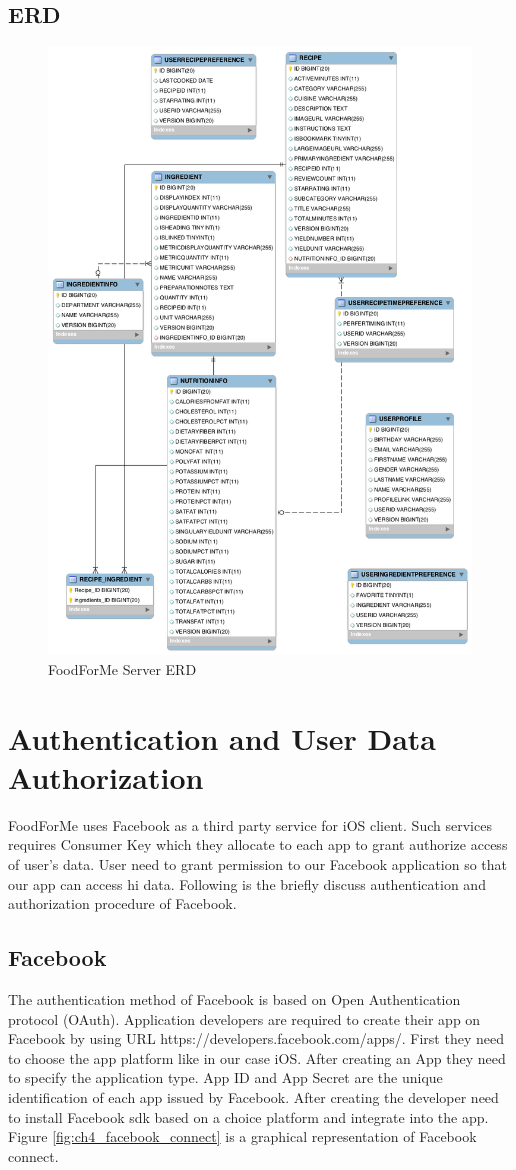 \newpage
\subsection{ERD}

\begin{figure}[h]
	\centering
	\includegraphics[width=.68\linewidth]{figures/ch4_erd_and_class_dig/ch4_erd.png}
	\caption{FoodForMe Server ERD}
	\label{fig:ch4_erd}
\end{figure}

\newpage
\section{Authentication and User Data Authorization}

FoodForMe uses Facebook as a third party service for iOS client. Such services requires Consumer Key which they allocate to each app to grant authorize access of user’s data. User need to grant permission to our Facebook application so that our app can access hi data.  Following is the briefly discuss authentication and authorization procedure of Facebook.

\subsection{Facebook}

The authentication method of Facebook is based on Open Authentication protocol (OAuth). Application developers are required to create their app on Facebook by using URL  https://developers.facebook.com/apps/. First they need to choose the app platform like in our case iOS. After creating an App they need to specify the application type.  App ID and App Secret are the unique identification of each app issued by Facebook. After creating the developer need to install Facebook sdk based on a choice platform and integrate into the app. Figure \ref{fig:ch4_facebook_connect} is a graphical representation of Facebook connect.\newline

